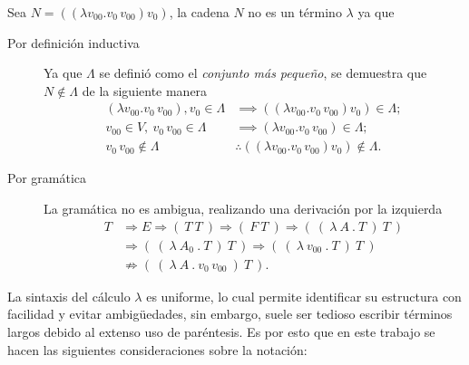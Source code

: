 \begin{exmp} Sea \( N = ((λv_{00}.v_{0}\, v_{00}) v_{0}) \), la cadena \( N \) no es un término \( λ \) ya que

  \begin{description}
  \item[Por definición inductiva] Ya que \( Λ \) se definió como el \emph{conjunto más pequeño}, se demuestra que \( N \not\in Λ \) de la siguiente manera
    \begin{align*}
      (λv_{00}.v_{0}\, v_{00}), v_{0} \in Λ &\implies ((λv_{00}.v_{0}\, v_{00}) v_{0}) \in Λ; \\
      v_{00} \in V,\ v_{0}\, v_{00} \in Λ &\implies (λv_{00}.v_{0}\, v_{00}) \in Λ; \\
      v_{0}\, v_{00} \not\in Λ &\therefore ((λv_{00}.v_{0}\, v_{00}) v_{0}) \not\in Λ.
    \end{align*}
  \item[Por gramática] La gramática no es ambigua, realizando una derivación por la izquierda
    \begin{align*}
      T &\Rightarrow E \Rightarrow (\ T\ T\ ) \Rightarrow (\ F\ T\ ) \Rightarrow (\ (\ λ\ A\ .\ T\ )\ T\ ) \\
        &\Rightarrow (\ (\ λ\ A_{0}\ .\ T\ )\ T\ ) \Rightarrow (\ (\ λ\ v_{00}\ .\ T\ )\ T\ ) \\
        &\nRightarrow (\ (\ λ\ A\ .\ v_{0}\, v_{00}\ )\ T\ ).
    \end{align*}
  \end{description}
\end{exmp}

La sintaxis del cálculo \( λ \) es uniforme, lo cual permite identificar su estructura con facilidad y evitar ambigüedades, sin embargo, suele ser tedioso escribir términos largos debido al extenso uso de paréntesis. Es por esto que en este trabajo se hacen las siguientes consideraciones sobre la notación:

